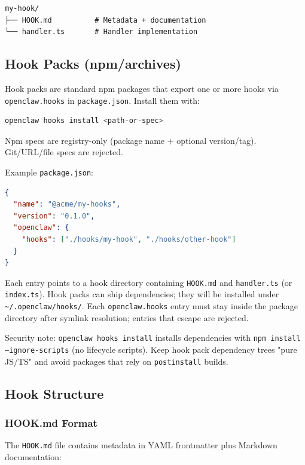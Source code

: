 \begin{lstlisting}
my-hook/
├── HOOK.md          # Metadata + documentation
└── handler.ts       # Handler implementation
\end{lstlisting}


\subsection{Hook Packs (npm/archives)}


Hook packs are standard npm packages that export one or more hooks via \texttt{openclaw.hooks} in
\texttt{package.json}. Install them with:

\begin{lstlisting}[language=bash]
openclaw hooks install <path-or-spec>
\end{lstlisting}


Npm specs are registry-only (package name + optional version/tag). Git/URL/file specs are rejected.

Example \texttt{package.json}:

\begin{lstlisting}[language=json]
{
  "name": "@acme/my-hooks",
  "version": "0.1.0",
  "openclaw": {
    "hooks": ["./hooks/my-hook", "./hooks/other-hook"]
  }
}
\end{lstlisting}


Each entry points to a hook directory containing \texttt{HOOK.md} and \texttt{handler.ts} (or \texttt{index.ts}).
Hook packs can ship dependencies; they will be installed under \texttt{\textasciitilde{}/.openclaw/hooks/}.
Each \texttt{openclaw.hooks} entry must stay inside the package directory after symlink
resolution; entries that escape are rejected.

Security note: \texttt{openclaw hooks install} installs dependencies with \texttt{npm install --ignore-scripts}
(no lifecycle scripts). Keep hook pack dependency trees "pure JS/TS" and avoid packages that rely
on \texttt{postinstall} builds.

\subsection{Hook Structure}


\subsubsection{HOOK.md Format}


The \texttt{HOOK.md} file contains metadata in YAML frontmatter plus Markdown documentation:

